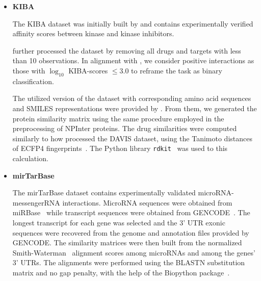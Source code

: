 \begin{itemize}
    \item \textbf{KIBA~\cite{tang2014making, he2017simboost, huang2020deeppurpose}}

    The KIBA dataset was initially built by  and contains experimentally verified affinity scores between kinase and kinase inhibitors.

     further processed the dataset by removing all drugs and targets with less than 10 observations. In alignment with , we consider positive interactions as those with $\log_{10}$ KIBA-scores $\leq 3.0$ to reframe the task as binary classification.

    The utilized version of the dataset with corresponding amino acid sequences and SMILES representations were provided by . From them, we generated the protein similarity matrix using the same procedure employed in the preprocessing of NPInter proteins. The drug similarities were computed similarly to how  processed the DAVIS dataset, using the Tanimoto distances of ECFP4 fingerprints~\cite{rogers2005using,pahikkala2015more}. The Python library \texttt{rdkit}~\cite{landrum2023rdkit} was used to this calculation.


    \item \textbf{mirTarBase~\cite{hsu2011mirtarbase, huang2022mirtarbase}}

    The mirTarBase dataset contains experimentally validated microRNA-messengerRNA interactions. MicroRNA sequences were obtained from miRBase~\cite{griffiths-jones2006mirbase} while transcript sequences were obtained from GENCODE~\cite{frankish2021gencode}. The longest transcript for each gene was selected and the 3' UTR exonic sequences were recovered from the genome and annotation files provided by GENCODE. The similarity matrices were then built from the normalized Smith-Waterman~\cite{yamanishi2008prediction} alignment scores among microRNAs and among the genes' 3' UTRs. The alignments were performed using the BLASTN substitution matrix and no gap penalty, with the help of the Biopython package~\cite{cock2009biopython}.


\end{itemize}
